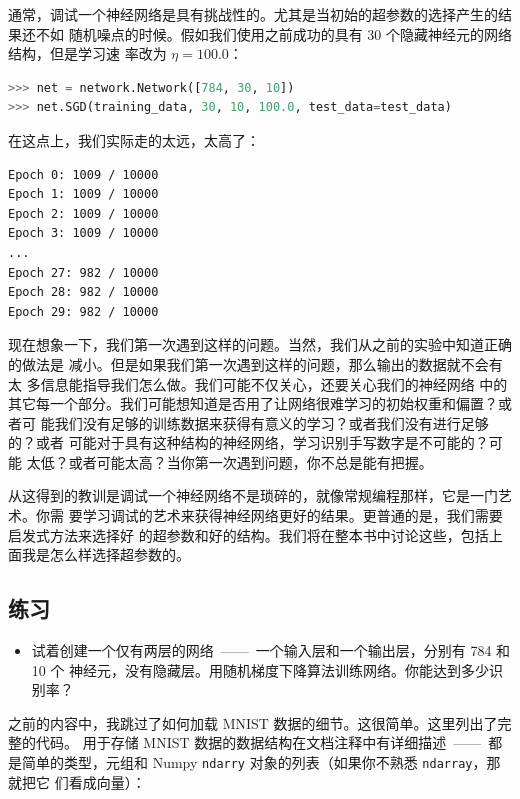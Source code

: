 通常，调试一个神经网络是具有挑战性的。尤其是当初始的超参数的选择产生的结果还不如
随机噪点的时候。假如我们使用之前成功的具有 30 个隐藏神经元的网络结构，但是学习速
率改为 $\eta = 100.0$：

\begin{lstlisting}[language=Python]
>>> net = network.Network([784, 30, 10])
>>> net.SGD(training_data, 30, 10, 100.0, test_data=test_data)
\end{lstlisting}

在这点上，我们实际走的太远，\learningrate{}太高了：

\begin{lstlisting}[language=sh]
Epoch 0: 1009 / 10000
Epoch 1: 1009 / 10000
Epoch 2: 1009 / 10000
Epoch 3: 1009 / 10000
...
Epoch 27: 982 / 10000
Epoch 28: 982 / 10000
Epoch 29: 982 / 10000
\end{lstlisting}

现在想象一下，我们第一次遇到这样的问题。当然，我们从之前的实验中知道正确的做法是
减小\learningrate{}。但是如果我们第一次遇到这样的问题，那么输出的数据就不会有太
多信息能指导我们怎么做。我们可能不仅关心\learningrate{}，还要关心我们的神经网络
中的其它每一个部分。我们可能想知道是否用了让网络很难学习的初始权重和偏置？或者可
能我们没有足够的训练数据来获得有意义的学习？或者我们没有进行足够的\epoch{}？或者
可能对于具有这种结构的神经网络，学习识别手写数字是不可能的？可能\learningrate{}
太低？或者可能\learningrate{}太高？当你第一次遇到问题，你不总是能有把握。

从这得到的教训是调试一个神经网络不是琐碎的，就像常规编程那样，它是一门艺术。你需
要学习调试的艺术来获得神经网络更好的结果。更普通的是，我们需要启发式方法来选择好
的超参数和好的结构。我们将在整本书中讨论这些，包括上面我是怎么样选择超参数的。

\subsection*{练习}

\begin{itemize}
\item 试着创建一个仅有两层的网络~——~一个输入层和一个输出层，分别有 784 和 10 个
  神经元，没有隐藏层。用随机梯度下降算法训练网络。你能达到多少识别率？
\end{itemize}

之前的内容中，我跳过了如何加载 MNIST 数据的细节。这很简单。这里列出了完整的代码。
用于存储 MNIST 数据的数据结构在文档注释中有详细描述~——~都是简单的类型，元组和
Numpy \lstinline!ndarry! 对象的列表（如果你不熟悉 \lstinline!ndarray!，那就把它
  们看成向量）：

